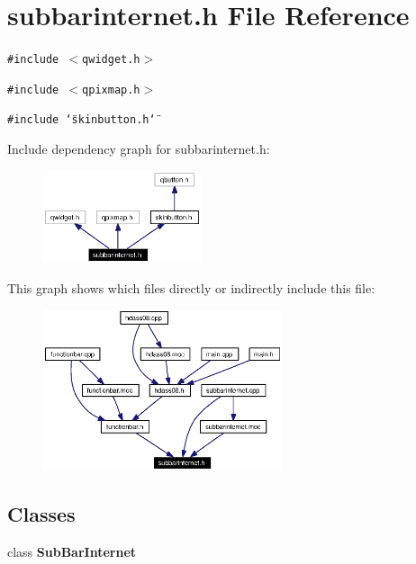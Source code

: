 \section{subbarinternet.h File Reference}
\label{subbarinternet_8h}


{\tt \#include $<$qwidget.h$>$}\par
{\tt \#include $<$qpixmap.h$>$}\par
{\tt \#include \char`\"{}skinbutton.h\char`\"{}}\par


Include dependency graph for subbarinternet.h:\begin{figure}[H]
\begin{center}
\leavevmode
\includegraphics[width=131pt]{subbarinternet_8h__incl}
\end{center}
\end{figure}


This graph shows which files directly or indirectly include this file:\begin{figure}[H]
\begin{center}
\leavevmode
\includegraphics[width=199pt]{subbarinternet_8h__dep__incl}
\end{center}
\end{figure}
\subsection*{Classes}
\begin{CompactItemize}
\item 
class {\bf Sub\-Bar\-Internet}
\end{CompactItemize}

